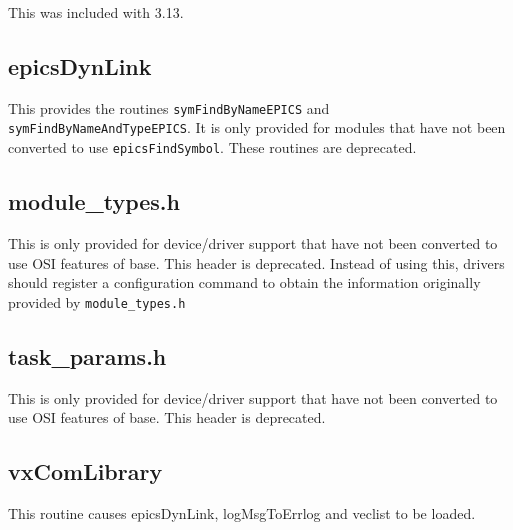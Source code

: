 This was included with 3.13.

\subsection{epicsDynLink}

This provides the routines \verb|symFindByNameEPICS| and \verb|symFindByNameAndTypeEPICS|.
It is only provided for modules that have not been converted to use \verb|epicsFindSymbol|.
These routines are deprecated.

\subsection{module\_types.h}

This is only provided for device/driver support that have not been converted to use OSI features of base.
This header is deprecated.
Instead of using this, drivers should register a configuration command to obtain
the information originally provided by \verb|module_types.h|

\subsection{task\_params.h}

This is only provided for device/driver support that have not been converted to use OSI features of base.
This header is deprecated.

\subsection{vxComLibrary}

This routine causes epicsDynLink, logMsgToErrlog and veclist to be loaded.
